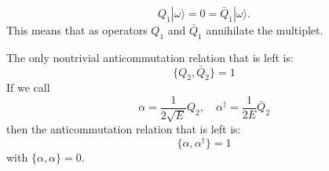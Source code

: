 \begin{equation}
  Q_1|\omega\rangle = 0 = \bar{Q}_{\dot{1}}|\omega\rangle.
\end{equation}
This means that as operators $Q_1$ and $\bar{Q}_{\dot{1}}$ annihilate the
multiplet. 
\par The only nontrivial anticommutation relation that is left is:
\begin{equation}
  \{Q_2,\bar{Q}_{\dot{2}}\} = 1
\end{equation}
If we call
\begin{equation}
  \alpha = \frac{1}{2\sqrt{E}}Q_2,\quad \alpha^\dagger
  = \frac{1}{2E}\bar{Q}_{\dot{2}}
\end{equation}
then the anticommutation relation that is left is:
\begin{equation}
  \{\alpha,\alpha^\dagger\} = 1
\end{equation}
with $\{\alpha,\alpha\} = 0$.

